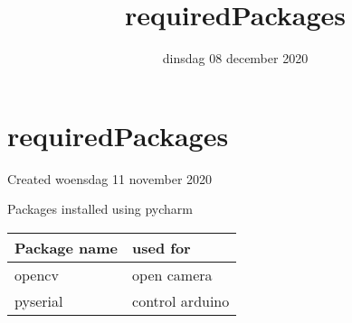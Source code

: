 \documentclass{scrartcl}
\title{requiredPackages}
\date{dinsdag 08 december 2020}
\author{}
\begin{document}
\maketitle

		\section{requiredPackages}

Created woensdag 11 november 2020



Packages installed using pycharm

\begin{tabular}{ |l|l| }
\hline
 Package name & used for \tabularnewline
\hline
\hline
 opencv & open camera \tabularnewline
\hline
 pyserial & control arduino \tabularnewline
\hline
\end{tabular}
\end{document}
